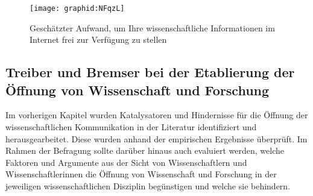 \begin{figure}[h!]
\texttt{[image: graphid:NFqzL]}
\caption{Geschätzter Aufwand, um Ihre wissenschaftliche Informationen im Internet frei zur Verfügung zu stellen}
\end{figure}

\subsection{Treiber und Bremser bei der Etablierung der Öffnung von Wissenschaft und Forschung}

Im vorherigen Kapitel wurden Katalysatoren und Hindernisse für die Öffnung der wissenschaftlichen Kommunikation in der Literatur identifiziert und herausgearbeitet. Diese wurden anhand der empirischen Ergebnisse überprüft. Im Rahmen der Befragung sollte darüber hinaus auch evaluiert werden, welche Faktoren und Argumente aus der Sicht von Wissenschaftlern und Wissenschaftlerinnen die Öffnung von Wissenschaft und Forschung in der jeweiligen wissenschaftlichen Disziplin begünstigen und welche sie behindern.

